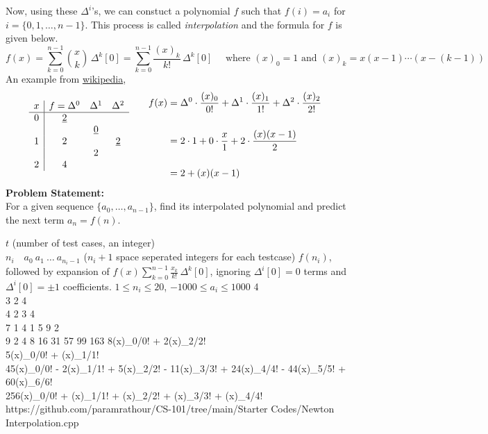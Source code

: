 Now, using these $\Delta ^{i}$'s, we can constuct a polynomial $f$ such that $f(i)=a_i$ for $i=\{0,1,\ldots,n-1\}$. This process is called \emph{interpolation} and the formula for $f$ is given below.
\begin{equation}
	f(x)=\sum _{k=0}^{n-1}{\binom {x}{k}}\,\Delta ^{k}[0]=\sum _{k=0}^{n-1}\frac{(x)_k}{k!}\,\Delta ^{k}[0]%
	\quad\text{ where $(x)_0 = 1$ and $(x)_k=x(x-1)\cdots(x-(k-1))$}
\end{equation}
An example from \href{https://en.wikipedia.org/wiki/Finite_difference#Newton's_series}{wikipedia},
\vspace{-1em}\begin{equation}
	{{
	\begin{matrix}{
	\begin{array}{c|ccc} x&f=\Delta ^{0}&\Delta ^{1}&\Delta ^{2}\\\hline 0&{\underline {2}}&&\\
	&&{\underline {0}}&\\
	1&2&&{\underline {2}}\\
	&&2&\\
	2&4&&
	\end{array}}
	&\quad {
	\begin{aligned}
	f(x)&=\Delta ^{0}\cdot {\dfrac {(x)_{0}}{0!}}+\Delta ^{1}\cdot {\dfrac {(x)_{1}}{1!}}+\Delta ^{2}\cdot {\dfrac {(x)_{2}}{2!}}\quad\\\\
	&=2\cdot 1+0\cdot {\dfrac {x}{1}}+2\cdot {\dfrac {(x)(x-1)}{2}}\\\\
	&=2+(x)(x-1)
	\end{aligned}}\end{matrix}}}\vspace{-0.5em}
\end{equation}
\textbf{Problem Statement:}\\
For a given sequence $\{a_0,\ldots,a_{n-1}\}$, find its interpolated polynomial and predict the next term $a_{n}=f(n)$.
\begin{testcases}
	{$t$ \hfill(number of test cases, an integer)\\$n_i\quad a_{0}\ a_1\ \ldots\ a_{n_i-1}$ \hfill($n_i+1$ space seperated integers for each testcase)}
	{$f(n_i)$, followed by expansion of $f(x)\displaystyle\sum _{k=0}^{n-1}\frac{x_k}{k!}\,\Delta ^{k}[0]$, ignoring $\Delta ^{i}[0]=0$ terms and $\Delta ^{i}[0]=\pm1$ coefficients.}
	{$1 \leq n_i \leq 20$, $-1000 \leq a_i \leq 1000$}
	{4\\3 2 4\\4 2 3 4\\7 1 4 1 5 9 2\\9 2 4 8 16 31 57 99 163}
	{8(x)\_{0}/0! + 2(x)\_{2}/2!\\5\quad(x)\_{0}/0! + (x)\_{1}/1!\\45(x)\_{0}/0! - 2(x)\_{1}/1! + 5(x)\_{2}/2! - 11(x)\_{3}/3! + 24(x)\_{4}/4! - 44(x)\_{5}/5! + 60(x)\_{6}/6!\\256\quad(x)\_{0}/0! + (x)\_{1}/1! + (x)\_{2}/2! + (x)\_{3}/3! + (x)\_{4}/4!}
	{https://github.com/paramrathour/CS-101/tree/main/Starter Codes/Newton Interpolation.cpp}
\end{testcases}
